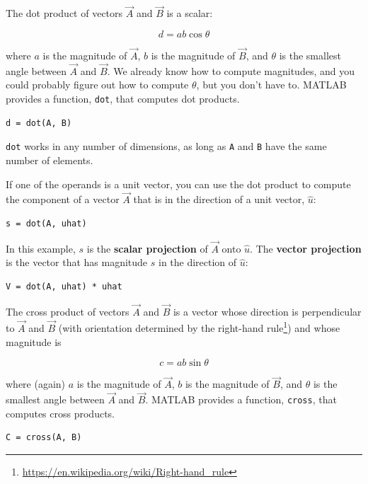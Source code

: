 \documentclass{book}
\newcommand{\uvec}[1]{\hat{#1}}
\begin{document}
The dot product of vectors $\vec{A}$ and $\vec{B}$ is a scalar:

\begin{equation}
d = a b \cos \theta
\end{equation}

where $a$ is the magnitude of $\vec{A}$, $b$ is the magnitude of
$\vec{B}$, and $\theta$ is the smallest angle between $\vec{A}$ and
$\vec{B}$.  We already know how to compute magnitudes, and you could
probably figure out how to compute $\theta$, but you don't have to.
MATLAB provides a function, {\tt dot}, that computes dot products.

\begin{verbatim}
d = dot(A, B)
\end{verbatim}

{\tt dot} works in any number of dimensions, as long as {\tt A}
and {\tt B} have the same number of elements.

If one of the operands is a unit vector, you can use the dot
product to compute the component of a vector $\vec{A}$ that is in
the direction of a unit vector, $\uvec{u}$:

\begin{verbatim}
s = dot(A, uhat)
\end{verbatim}

In this example, $s$ is the {\bf scalar projection} of $\vec{A}$
onto $\uvec{u}$.  The {\bf vector projection} is the vector
that has magnitude $s$ in the direction of $\uvec{u}$:

\begin{verbatim}
V = dot(A, uhat) * uhat
\end{verbatim}

The cross product of vectors $\vec{A}$ and $\vec{B}$ is a vector whose
direction is perpendicular to $\vec{A}$ and $\vec{B}$
(with orientation determined by the right-hand
rule\footnote{\url{https://en.wikipedia.org/wiki/Right-hand_rule}})
and whose magnitude is

\begin{equation}
c = a b \sin \theta
\end{equation}

where (again) $a$ is the magnitude of $\vec{A}$, $b$ is the magnitude of
$\vec{B}$, and $\theta$ is the smallest angle between $\vec{A}$ and
$\vec{B}$. MATLAB provides a function, {\tt cross}, that computes cross
products.

\begin{verbatim}
C = cross(A, B)
\end{verbatim}
\end{document}
